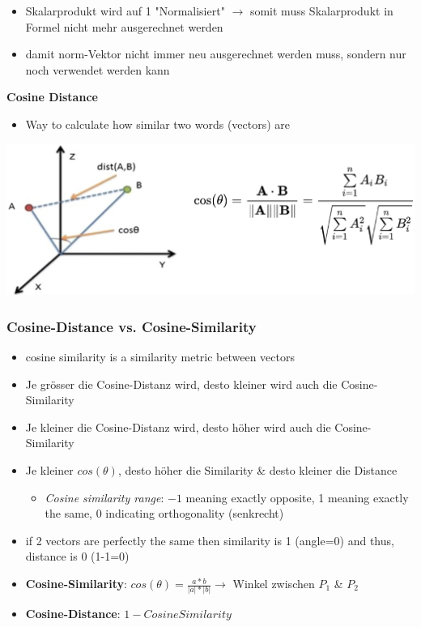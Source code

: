 \begin{itemize}
    \item Skalarprodukt wird auf 1 "Normalisiert" $\rightarrow$ somit muss Skalarprodukt in Formel nicht mehr ausgerechnet werden
    \item damit norm-Vektor nicht immer neu ausgerechnet werden muss, sondern nur noch verwendet werden kann
\end{itemize}
\textbf{Cosine Distance}
\begin{itemize}
    \item Way to calculate how similar two words (vectors) are
\end{itemize}
\includegraphics[width=\linewidth]{./img/cosine_distance.png}

\subsubsection{Cosine-Distance vs. Cosine-Similarity}
\begin{itemize}
    \item cosine similarity is a similarity metric between vectors
    \item Je grösser die Cosine-Distanz wird, desto kleiner wird auch die Cosine-Similarity
    \item Je kleiner die Cosine-Distanz wird, desto höher wird auch die Cosine-Similarity
    \item Je kleiner $cos(\theta)$, desto höher die Similarity \& desto kleiner  die Distance
    \begin{itemize}
        \item \textit{Cosine similarity range}: $-1$ meaning exactly opposite, 1 meaning exactly the same, 0 indicating orthogonality (senkrecht)
    \end{itemize} 
    \item if 2 vectors are perfectly the same then similarity is 1 (angle=0) and thus, distance is 0 (1-1=0)
    \item \textbf{Cosine-Similarity}: $cos(\theta) = \frac{a * b}{|a|*|b|} \rightarrow$ Winkel zwischen $P_1$ \& $P_2$
    \item \textbf{Cosine-Distance}: $1 - CosineSimilarity$
\end{itemize}